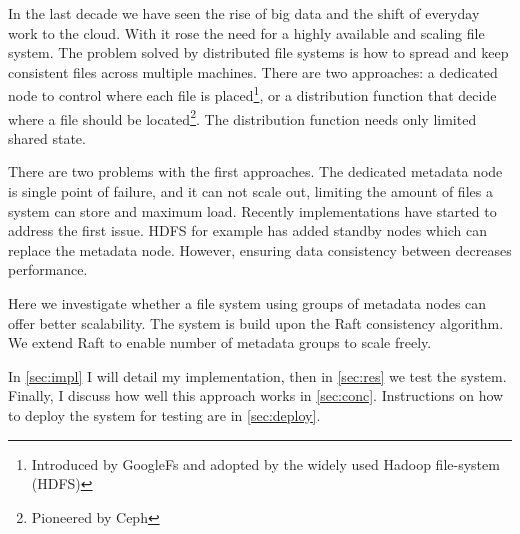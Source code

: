 In the last decade we have seen the rise of big data and the shift of everyday work to the cloud. With it rose the need for a highly available and scaling file system. The problem solved by distributed file systems is how to spread and keep consistent files across multiple machines. There are two approaches: a dedicated node to control where each file is placed\footnote{Introduced by GoogleFs\cite{gfs} and adopted by the widely used Hadoop file-system\cite{hdfs} (HDFS)}, or a distribution function that decide where a file should be located\footnote{Pioneered by Ceph\cite{ceph}}. The distribution function needs only limited shared state.

There are two problems with the first approaches. The dedicated metadata node is single point of failure, and it can not scale out, limiting the amount of files a system can store and maximum load. Recently implementations have started to address the first issue. HDFS for example has added standby nodes \cite{hdfs_ha_nfs, hdfs_ha_q} which can replace the metadata node. However, ensuring data consistency between decreases performance.


Here we investigate whether a file system using groups of metadata nodes can offer better scalability. The system is build upon the Raft\cite{raft} consistency algorithm. We extend Raft to enable number of metadata groups to scale freely.

In \cref{sec:impl} I will detail my implementation, then in \cref{sec:res} we test the system. Finally, I discuss how well this approach works in \cref{sec:conc}. Instructions on how to deploy the system for testing are in \cref{sec:deploy}.

